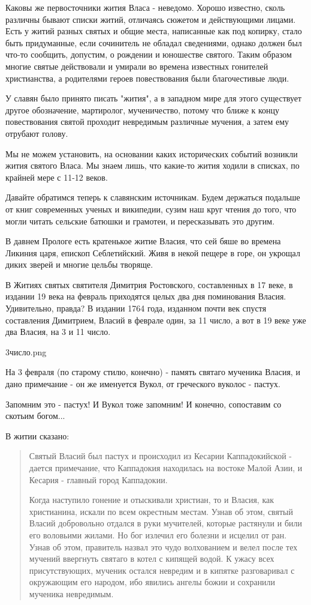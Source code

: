 \documentclass[a5paper,11pt,openany]{article}
\begin{document}
   Каковы же первосточники жития Власа - неведомо. Хорошо известно, сколь различны бывают списки житий, отличаясь сюжетом и действующими лицами. Есть у житий разных святых и общие места, написанные как под копирку, стало быть придуманные, если сочинитель не обладал сведениями, однако должен был что-то сообщить, допустим, о рождении и юношестве святого. Таким образом многие святые действовали и умирали во времена известных гонителей христианства, а родителями героев повествования были благочестивые люди. 

   У славян было принято писать "жития", а в западном мире для этого существует другое обозначение, мартиролог, мученичество, потому что ближе к концу повествования святой проходит невредимым различные мучения, а затем ему отрубают голову.   

    Мы не можем установить, на основании каких исторических событий возникли жития святого Власа. Мы знаем лишь, что какие-то жития ходили в списках, по крайней мере с 11-12 веков.

   Давайте обратимся теперь к славянским источникам. Будем держаться подальше от книг современных ученых и википедии, сузим наш круг чтения до того, что могли читать сельские батюшки и грамотеи, и пересказывать это другим.

   В давнем Прологе есть кратенькое житие Власия, что сей бяше во времена Ликиния царя, епископ Себлетийский. Живя в некой пещере в горе, он укрощал диких зверей и многие цельбы творяще.

   В Житиях святых святителя Димитрия Ростовского, составленных в 17 веке, в издании 19 века на февраль приходятся целых два дня поминования Власия. Удивительно, правда? В издании 1764 года, изданном почти век спустя составления Димитрием, Власий в феврале один, за 11 число, а вот в 19 веке уже два Власия, на 3 и 11 число.

3число.png

   На 3 февраля (по старому стилю, конечно) - память святаго мученика Власия, и дано примечание - он же именуется Вукол, от греческого вуколос - пастух.

   Запомним это - пастух! И Вукол тоже запомним! И конечно, сопоставим со скотьим богом...

   В житии сказано:

\begin{quotation}
\noindent Святый Власий был пастух и происходил из Кесарии Каппадокийской - дается примечание, что Каппадокия находилась на востоке Малой Азии, и Кесария - главный город Каппадокии.

   Когда наступило гонение и отыскивали христиан, то и Власия, как христианина, искали по всем окрестным местам. Узнав об этом, святый Власий добровольно отдался в руки мучителей, которые растянули и били его воловьими жилами. Но бог излечил его болезни и исцелил от ран. Узнав об этом, правитель назвал это чудо волхованием и велел после тех мучений ввергнуть святаго в котел с кипящей водой. К ужасу всех присутствующих, мученик остался невредим и в кипятке разговаривал с окружающим его народом, ибо явились ангелы божии и сохранили мученика невредимым.\end{quotation} 
\end{document}
